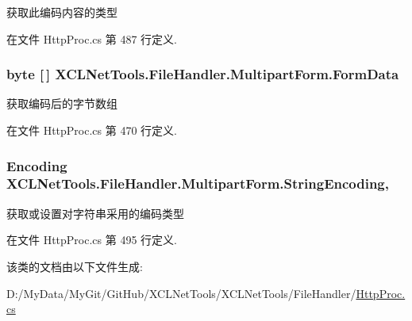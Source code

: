 获取此编码内容的类型 



在文件 Http\-Proc.\-cs 第 487 行定义.

\hypertarget{class_x_c_l_net_tools_1_1_file_handler_1_1_multipart_form_ad540886372239dbb4fcc975e694be5d9}{
\subsubsection[{Form\-Data}]{\setlength{\rightskip}{0pt plus 5cm}byte \mbox{[}$\,$\mbox{]} X\-C\-L\-Net\-Tools.\-File\-Handler.\-Multipart\-Form.\-Form\-Data\hspace{0.3cm}{\ttfamily [get]}}}\label{class_x_c_l_net_tools_1_1_file_handler_1_1_multipart_form_ad540886372239dbb4fcc975e694be5d9}


获取编码后的字节数组 



在文件 Http\-Proc.\-cs 第 470 行定义.

\hypertarget{class_x_c_l_net_tools_1_1_file_handler_1_1_multipart_form_ade83206c0e41ad24ba543ebd89e0281f}{
\subsubsection[{String\-Encoding}]{\setlength{\rightskip}{0pt plus 5cm}Encoding X\-C\-L\-Net\-Tools.\-File\-Handler.\-Multipart\-Form.\-String\-Encoding\hspace{0.3cm}{\ttfamily [get]}, {\ttfamily [set]}}}\label{class_x_c_l_net_tools_1_1_file_handler_1_1_multipart_form_ade83206c0e41ad24ba543ebd89e0281f}


获取或设置对字符串采用的编码类型 



在文件 Http\-Proc.\-cs 第 495 行定义.



该类的文档由以下文件生成\-:\begin{DoxyCompactItemize}
\item 
D\-:/\-My\-Data/\-My\-Git/\-Git\-Hub/\-X\-C\-L\-Net\-Tools/\-X\-C\-L\-Net\-Tools/\-File\-Handler/\hyperlink{_http_proc_8cs}{Http\-Proc.\-cs}\end{DoxyCompactItemize}
